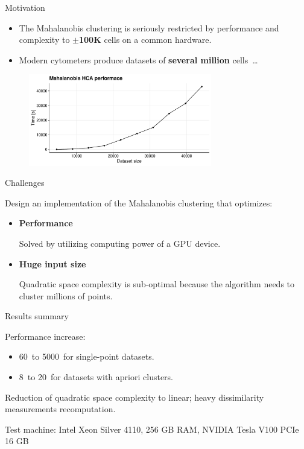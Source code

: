 \documentclass[10pt]{beamer}
\begin{document}
\begin{frame}{Motivation}
	\begin{itemize}
		\item The Mahalanobis clustering is seriously restricted by performance and complexity to \textbf{$\pm$100K} cells on a common hardware.
	
		\item Modern cytometers produce datasets of \textbf{several million} cells~\dots
	\end{itemize}
	\begin{figure}
	\includegraphics[width=8cm]{img/scalability}
	\end{figure}

\end{frame}

\begin{frame}{Challenges}
	
	Design an implementation of the Mahalanobis clustering that optimizes:
	\begin{itemize}
		\item \textbf{Performance}
		
		Solved by utilizing computing power of a GPU device.
		\item \textbf{Huge input size}
		
		Quadratic space complexity is sub-optimal because the algorithm needs to cluster millions of points.
	\end{itemize}
	
\end{frame}

\begin{frame}{Results summary}
	
	Performance increase:
	\begin{itemize}
		\item 60\texttimes\ to 5000\texttimes\ for single-point datasets.
		\item 8\texttimes\ to 20\texttimes\ for datasets with apriori clusters.
	\end{itemize}

	Reduction of quadratic space complexity to linear; heavy dissimilarity measurements recomputation.
	
	Test machine: Intel Xeon Silver 4110, 256 GB
	RAM, NVIDIA Tesla V100 PCIe 16 GB
	
\end{frame}
\end{document}
